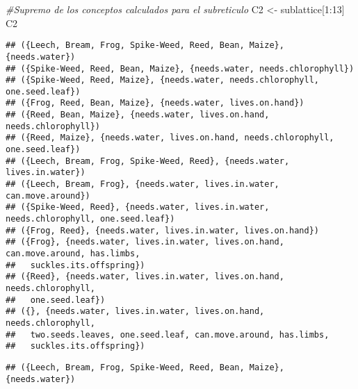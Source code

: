 \documentclass[
]{book}
\newenvironment{Shaded}{\begin{snugshade}}{\end{snugshade}}
\newcommand{\CommentTok}[1]{\textcolor[rgb]{0.56,0.35,0.01}{\textit{#1}}}
\newcommand{\DecValTok}[1]{\textcolor[rgb]{0.00,0.00,0.81}{#1}}
\newcommand{\FunctionTok}[1]{\textcolor[rgb]{0.00,0.00,0.00}{#1}}
\newcommand{\NormalTok}[1]{#1}
\newcommand{\OtherTok}[1]{\textcolor[rgb]{0.56,0.35,0.01}{#1}}
\newcommand{\SpecialCharTok}[1]{\textcolor[rgb]{0.00,0.00,0.00}{#1}}
\begin{document}
\begin{Shaded}
\begin{Highlighting}[]
\CommentTok{\#Supremo de los conceptos calculados para el subreticulo}
\NormalTok{C2 }\OtherTok{\textless{}{-}}\NormalTok{ sublattice[}\DecValTok{1}\SpecialCharTok{:}\DecValTok{13}\NormalTok{]}
\NormalTok{C2}
\end{Highlighting}
\end{Shaded}

\begin{verbatim}
## ({Leech, Bream, Frog, Spike-Weed, Reed, Bean, Maize}, {needs.water})
## ({Spike-Weed, Reed, Bean, Maize}, {needs.water, needs.chlorophyll})
## ({Spike-Weed, Reed, Maize}, {needs.water, needs.chlorophyll, one.seed.leaf})
## ({Frog, Reed, Bean, Maize}, {needs.water, lives.on.hand})
## ({Reed, Bean, Maize}, {needs.water, lives.on.hand, needs.chlorophyll})
## ({Reed, Maize}, {needs.water, lives.on.hand, needs.chlorophyll, one.seed.leaf})
## ({Leech, Bream, Frog, Spike-Weed, Reed}, {needs.water, lives.in.water})
## ({Leech, Bream, Frog}, {needs.water, lives.in.water, can.move.around})
## ({Spike-Weed, Reed}, {needs.water, lives.in.water, needs.chlorophyll, one.seed.leaf})
## ({Frog, Reed}, {needs.water, lives.in.water, lives.on.hand})
## ({Frog}, {needs.water, lives.in.water, lives.on.hand, can.move.around, has.limbs,
##   suckles.its.offspring})
## ({Reed}, {needs.water, lives.in.water, lives.on.hand, needs.chlorophyll,
##   one.seed.leaf})
## ({}, {needs.water, lives.in.water, lives.on.hand, needs.chlorophyll,
##   two.seeds.leaves, one.seed.leaf, can.move.around, has.limbs,
##   suckles.its.offspring})
\end{verbatim}

\begin{Shaded}
\end{Shaded}

\begin{verbatim}
## ({Leech, Bream, Frog, Spike-Weed, Reed, Bean, Maize}, {needs.water})
\end{verbatim}

\begin{Shaded}
\end{Shaded}
\end{document}
